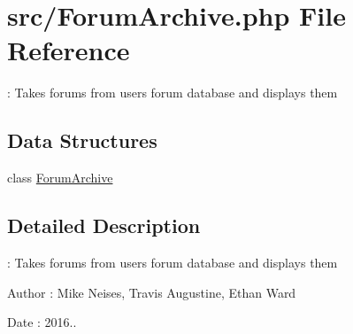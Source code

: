 \hypertarget{_forum_archive_8php}{}\section{src/\+Forum\+Archive.php File Reference}
\label{_forum_archive_8php}


\+: Takes forums from user\textquotesingle{}s forum database and displays them  


\subsection*{Data Structures}
\begin{DoxyCompactItemize}
\item 
class \hyperlink{class_forum_archive}{Forum\+Archive}
\end{DoxyCompactItemize}


\subsection{Detailed Description}
\+: Takes forums from user\textquotesingle{}s forum database and displays them 

\begin{DoxyAuthor}{Author}
\+: Mike Neises, Travis Augustine, Ethan Ward 
\end{DoxyAuthor}
\begin{DoxyDate}{Date}
\+: 2016.. 
\end{DoxyDate}
